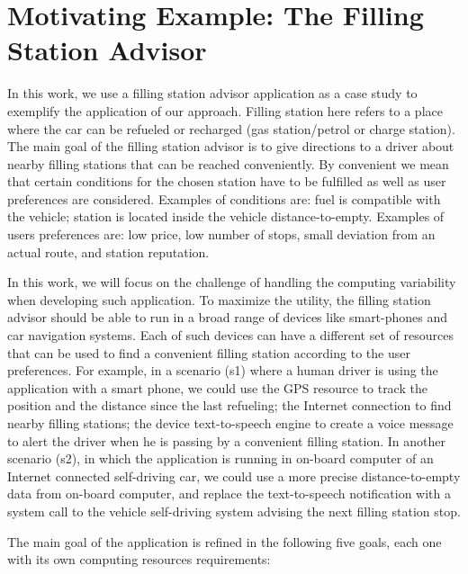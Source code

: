 \section{Motivating Example: The Filling Station Advisor}
\label{sec:case_study}

In this work, we use a filling station advisor application as a case study to exemplify the application of our approach.
Filling station here refers to a place where the car can be refueled or recharged (gas station/petrol or charge station). The main goal of the filling station advisor is to give directions to a driver about nearby filling stations that can be reached conveniently. By convenient we mean that certain conditions for the chosen station have to be fulfilled as well as user preferences are considered. Examples of conditions are: fuel is compatible with the vehicle; station is located inside the vehicle distance-to-empty. Examples of users preferences are: low price, low number of stops, small deviation from an actual route, and station reputation.

In this work, we will focus on the challenge of handling the computing variability when developing such application. To maximize the utility, the filling station advisor should be able to run in a broad range of devices like smart-phones and car navigation systems. Each of such devices can have a different set of resources that can be used to find a convenient filling station according to the user preferences. For example, in a scenario (s1) where a human driver is using the application with a smart phone, we could use the GPS resource to track the position and the distance since the last refueling; the Internet connection to find nearby filling stations; the device text-to-speech engine to create a voice message to alert the driver when he is passing by a convenient filling station. In another scenario (s2), in which the application is running in on-board computer of an Internet connected self-driving car, we could use a more precise distance-to-empty data from on-board computer, and replace the text-to-speech notification with a system call to the vehicle self-driving system advising the next filling station stop.

The main goal of the application is refined in the following five goals, each one with its own computing resources requirements:

